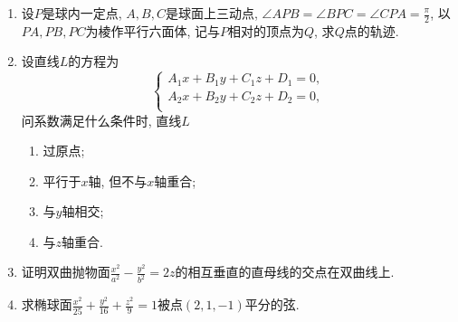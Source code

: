 \documentclass[12pt,a4paper,openany]{book}
\begin{document}
\begin{enumerate}
\item 设$P$是球内一定点, $A, B, C$是球面上三动点, $\displaystyle\angle{APB} = \angle{BPC} = \angle{CPA} = \frac{\pi}{2}$, 以$PA, PB, PC$为棱作平行六面体, 记与$P$相对的顶点为$Q$, 求$Q$点的轨迹.

\item 设直线$L$的方程为
\[
\left\{
\begin{aligned}
A_1x + B_1y + C_1z + D_1 = 0, \\
A_2x + B_2y + C_2z + D_2 = 0, \\
\end{aligned}
\right.
\]
问系数满足什么条件时, 直线$L$
\begin{enumerate}
\item 过原点;
\item 平行于$x$轴, 但不与$x$轴重合;
\item 与$y$轴相交;
\item 与$z$轴重合.
\end{enumerate}

\item 证明双曲抛物面$\displaystyle\frac{x^2}{a^2} - \frac{y^2}{b^2} = 2z$的相互垂直的直母线的交点在双曲线上.

\item 求椭球面$\displaystyle\frac{x^2}{25} + \frac{y^2}{16} + \frac{z^2}{9} = 1$被点$(2, 1, -1)$平分的弦.
\end{enumerate}
\end{document}
